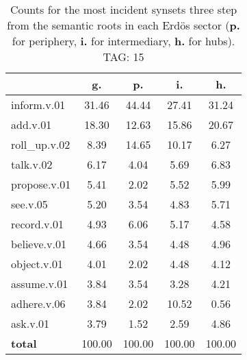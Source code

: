 \begin{table}[h!]
\begin{center}
\begin{tabular}{| l | c | c | c | c |}\hline
 & g. & p. & i. & h. \\\hline
inform.v.01 & 31.46  & 44.44  & 27.41  & 31.24 \\\hline
add.v.01 & 18.30  & 12.63  & 15.86  & 20.67 \\\hline
roll\_up.v.02 & 8.39  & 14.65  & 10.17  & 6.27 \\\hline
talk.v.02 & 6.17  & 4.04  & 5.69  & 6.83 \\\hline
propose.v.01 & 5.41  & 2.02  & 5.52  & 5.99 \\\hline
see.v.05 & 5.20  & 3.54  & 4.83  & 5.71 \\\hline
record.v.01 & 4.93  & 6.06  & 5.17  & 4.58 \\\hline
believe.v.01 & 4.66  & 3.54  & 4.48  & 4.96 \\\hline
object.v.01 & 4.01  & 2.02  & 4.48  & 4.12 \\\hline
assume.v.01 & 3.84  & 3.54  & 3.28  & 4.21 \\\hline
adhere.v.06 & 3.84  & 2.02  & 10.52  & 0.56 \\\hline
ask.v.01 & 3.79  & 1.52  & 2.59  & 4.86 \\\hline
{{\bf total}} & 100.00  & 100.00  & 100.00  & 100.00 \\\hline
\end{tabular}
\caption{Counts for the most incident synsets three step from the semantic roots in each Erd\"os sector ({\bf p.} for periphery, {\bf i.} for intermediary, {\bf h.} for hubs). TAG: 15}
\end{center}
\end{table}
